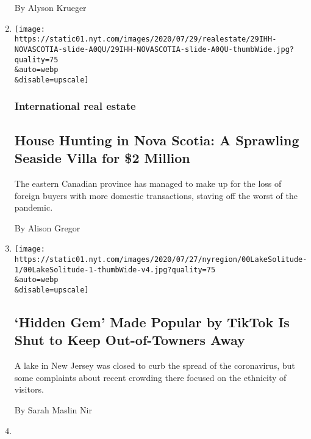 \begin{enumerate}
  By Alyson Krueger
\item
  \href{/2020/07/29/realestate/house-hunting-in-nova-scotia-a-sprawling-seaside-villa-for-2-million.html}{}

  \texttt{[image: https://static01.nyt.com/images/2020/07/29/realestate/29IHH-NOVASCOTIA-slide-A0QU/29IHH-NOVASCOTIA-slide-A0QU-thumbWide.jpg?quality=75\\\&auto=webp\\\&disable=upscale]}

  \hypertarget{international-real-estate}{%
  \subsubsection{International real
  estate}\label{international-real-estate}}

  \hypertarget{house-hunting-in-nova-scotia-a-sprawling-seaside-villa-for-2-million}{%
  \subsection{House Hunting in Nova Scotia: A Sprawling Seaside Villa
  for \$2
  Million}\label{house-hunting-in-nova-scotia-a-sprawling-seaside-villa-for-2-million}}

  The eastern Canadian province has managed to make up for the loss of
  foreign buyers with more domestic transactions, staving off the worst
  of the pandemic.

  By Alison Gregor
\item
  \href{/2020/07/29/nyregion/lake-solitude-closed-racism.html}{}

  \texttt{[image: https://static01.nyt.com/images/2020/07/27/nyregion/00LakeSolitude-1/00LakeSolitude-1-thumbWide-v4.jpg?quality=75\\\&auto=webp\\\&disable=upscale]}

  \hypertarget{hidden-gem-made-popular-by-tiktok-is-shut-to-keep-out-of-towners-away}{%
  \subsection{`Hidden Gem' Made Popular by TikTok Is Shut to Keep
  Out-of-Towners
  Away}\label{hidden-gem-made-popular-by-tiktok-is-shut-to-keep-out-of-towners-away}}

  A lake in New Jersey was closed to curb the spread of the coronavirus,
  but some complaints about recent crowding there focused on the
  ethnicity of visitors.

  By Sarah Maslin Nir
\item
  \href{/2020/07/28/books/time-for-a-literary-road-trip.html}{}


\end{enumerate}
